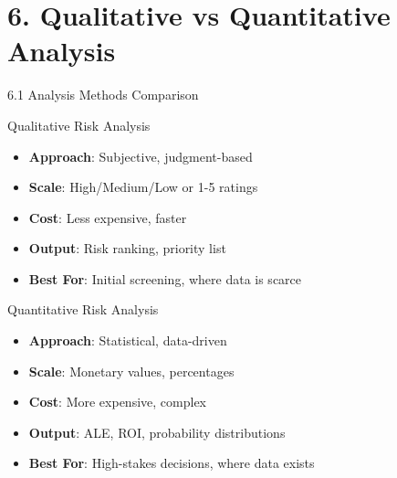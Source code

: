 \documentclass{beamer}
\begin{document}
	\section{6. Qualitative vs Quantitative Analysis}
	
	\begin{frame}{6.1 Analysis Methods Comparison}
		\begin{block}{Qualitative Risk Analysis}
			\begin{itemize}
				\item \textbf{Approach}: Subjective, judgment-based
				\item \textbf{Scale}: High/Medium/Low or 1-5 ratings
				\item \textbf{Cost}: Less expensive, faster
				\item \textbf{Output}: Risk ranking, priority list
				\item \textbf{Best For}: Initial screening, where data is scarce
			\end{itemize}
		\end{block}
		
		\begin{block}{Quantitative Risk Analysis}
			\begin{itemize}
				\item \textbf{Approach}: Statistical, data-driven
				\item \textbf{Scale}: Monetary values, percentages
				\item \textbf{Cost}: More expensive, complex
				\item \textbf{Output}: ALE, ROI, probability distributions
				\item \textbf{Best For}: High-stakes decisions, where data exists
			\end{itemize}
		\end{block}
	\end{frame}
	
\end{document}
